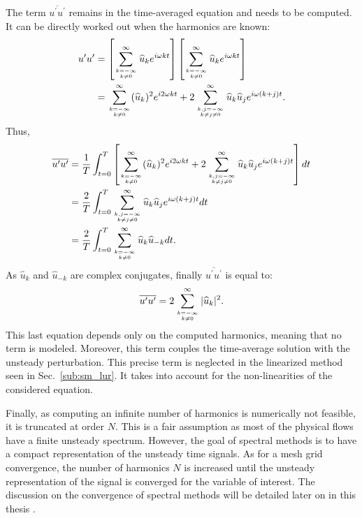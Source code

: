 The term $\overline{u^\prime u^\prime}$ remains in the time-averaged
equation and needs to be computed. It can be 
directly worked out when the harmonics are known:
\begin{equation}
	\begin{split}
		u^\prime u^\prime &= 
		\left[
			\sum_{k=-\infty \atop k \neq 0}^{\infty} \widehat{u}_k e^{i \omega k t} 
		\right]
		\left[
			\sum_{k=-\infty \atop k \neq 0}^{\infty} \widehat{u}_k e^{i \omega k t} 
		\right] \\
		&= \sum_{k=-\infty \atop k \neq 0}^{\infty} (\widehat{u}_k)^2
		   e^{i 2 \omega k t} +
		   2 \sum_{k,j=-\infty \atop k \neq j \neq 0}^{\infty} 
		   \widehat{u}_k \widehat{u}_j e^{i \omega (k + j) t}.
	\end{split}
\end{equation}
Thus,
\begin{equation}
	\begin{split}
		\overline{u^\prime u^\prime} &= 
		\frac{1}{T} \int_{t=0}^{T} \left[ 
			\sum_{k=-\infty \atop k \neq 0}^{\infty} (\widehat{u}_k)^2
		   	e^{i 2 \omega k t} +
		   	2 \sum_{k,j=-\infty \atop k \neq j \neq 0}^{\infty} 
		   	\widehat{u}_k \widehat{u}_j e^{i \omega (k + j) t} 
		\right] dt\\
		&= \frac{2}{T} \int_{t=0}^{T} \sum_{k,j=-\infty \atop k \neq j \neq 0}^{\infty} 
		   	\widehat{u}_k \widehat{u}_j 
		   	e^{i \omega (k + j) t} dt \\
		&= \frac{2}{T} \int_{t=0}^{T} 
			\sum_{k=-\infty \atop k \neq 0}^{\infty} 
			\widehat{u}_k \widehat{u}_{-k}  dt.
	\end{split}
\end{equation}
As $\widehat{u}_k$ and $\widehat{u}_{-k}$ are complex conjugates,
finally $\overline{u^\prime u^\prime}$ is equal to:
\begin{equation}
	\overline{u^\prime u^\prime} = 
	2 \sum_{k=-\infty \atop k \neq 0}^{\infty} |\widehat{u}_k|^2.
	\label{eq:sm_nlh_deterministic_stress_terms}
\end{equation}
This last equation depends only on the computed harmonics, meaning
that no term is modeled. Moreover, this term couples the
time-average solution with the unsteady perturbation. This precise
term is neglected in the linearized method seen in 
Sec.~\ref{sub:sm_lur}. It takes into account for the 
non-linearities of the considered equation.

Finally, as computing an infinite number of harmonics is 
numerically not feasible,
it is truncated at order $N$. 
This is a fair assumption as most
of the physical flows have a finite unsteady spectrum.
However, the goal of spectral
methods is to have a compact representation of the unsteady time
signals. As for a mesh grid convergence, the number of harmonics $N$
is increased until the unsteady representation of the signal is
converged for the variable of interest. The discussion on the
convergence of spectral methods will be detailed later on in this 
thesis .

